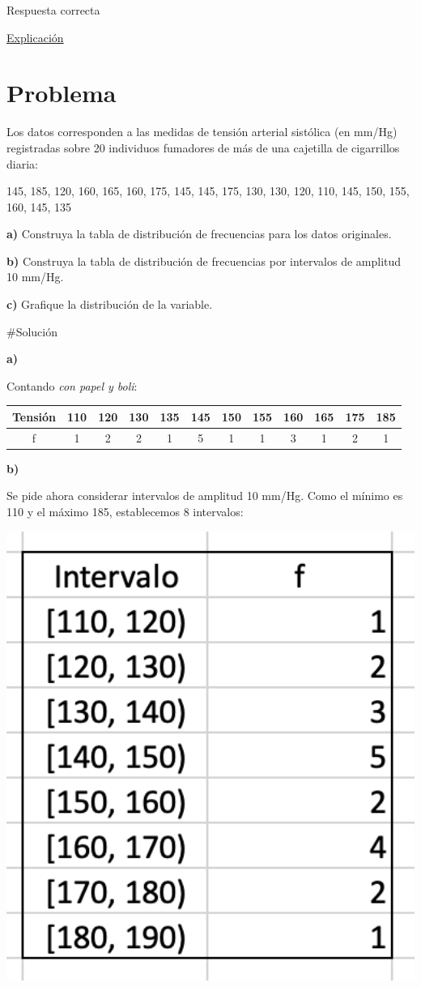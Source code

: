 \documentclass[
]{book}
\begin{document}
Respuesta correcta

\href{https://es.wikipedia.org/wiki/Estudio_de_cohorte}{Explicación}

\hypertarget{problema-4}{%
\section{Problema}\label{problema-4}}

Los datos corresponden a las medidas de tensión arterial sistólica (en mm/Hg) registradas sobre 20 individuos fumadores de más de una cajetilla de cigarrillos diaria:

145, 185, 120, 160, 165, 160, 175, 145, 145, 175, 130, 130, 120, 110, 145, 150, 155, 160, 145, 135

\textbf{a)} Construya la tabla de distribución de frecuencias para los datos originales.

\textbf{b)} Construya la tabla de distribución de frecuencias por intervalos de amplitud 10 mm/Hg.

\textbf{c)} Grafique la distribución de la variable.

\#Solución

\textbf{a)}

Contando \emph{con papel y boli}:

\begin{longtable}[]{@{}cccccccccccc@{}}
\toprule
Tensión & 110 & 120 & 130 & 135 & 145 & 150 & 155 & 160 & 165 & 175 & 185\tabularnewline
\midrule
\endhead
f & 1 & 2 & 2 & 1 & 5 & 1 & 1 & 3 & 1 & 2 & 1\tabularnewline
\bottomrule
\end{longtable}

\textbf{b)}

Se pide ahora considerar intervalos de amplitud 10 mm/Hg. Como el mínimo es 110 y el máximo 185, establecemos 8 intervalos:

\includegraphics[width=5.28in]{img/1_6}
\end{document}
